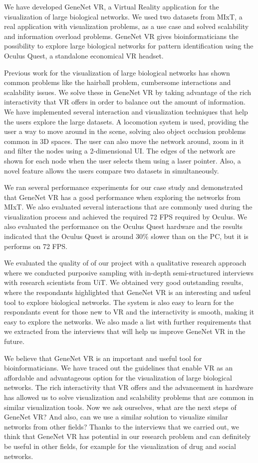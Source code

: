 We have developed GeneNet VR, a Virtual Reality application for the visualization of large biological networks. We used two datasets from MIxT, a real application with visualization problems, as a use case and solved scalability and information overload problems. GeneNet VR gives bioinformaticians the possibility to explore large biological networks for pattern identification using the Oculus Quest, a standalone economical VR headset.

Previous work for the visualization of large biological networks has shown common problems like the hairball problem, cumbersome interactions and scalability issues. We solve these in GeneNet VR by taking advantage of the rich interactivity that VR offers in order to balance out the amount of information. We have implemented several interaction and visualization techniques that help the users explore the large datasets. A locomotion system is used, providing the user a way to move around in the scene, solving also object occlusion problems common in 3D spaces. The user can also move the network around, zoom in it and filter the nodes using a 2-dimensional UI. The edges of the network are shown for each node when the user selects them using a laser pointer. Also, a novel feature allows the users compare two datasets in simultaneously.

We ran several performance experiments for our case study and demonstrated that GeneNet VR has a good performance when exploring the networks from MIxT. We also evaluated several interactions that are commonly used during the visualization process and achieved the required 72 FPS required by Oculus. We also evaluated the performance on the Oculus Quest hardware and the results indicated that the Oculus Quest is around 30\% slower than on the PC, but it is performs on 72 FPS.

We evaluated the quality of of our project with a qualitative research approach where we conducted purposive sampling with in-depth semi-structured interviews with research scientists from UiT. We obtained very good outstanding results, where the respondants highlighted that GeneNet VR is an interesting and usfeul tool to explore biological networks. The system is also easy to learn for the respondants event for those new to VR and the interactivity is smooth, making it easy to explore the networks. We also made a list with further requirements that we extracted from the interviews that will help us improve GeneNet VR in the future.

We believe that GeneNet VR is an important and useful tool for bioinformaticians. We have traced out the guidelines that enable VR as an affordable and advantageous option for the visualization of large biological networks. The rich interactivity that VR offers and the advancement in hardware has allowed us to solve visualization and scalability problems that are common in similar visualization tools. Now we ask ourselves, what are the next steps of GeneNet VR? And also, can we use a similar solution to visualize similar networks from other fields? Thanks to the interviews that we carried out, we think that GeneNet VR has potential in our research problem and can definitely be useful in other fields, for example for the visualization of drug and social networks.
